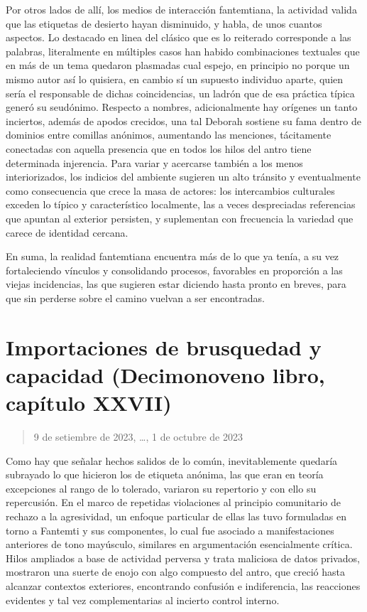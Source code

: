 \documentclass[
]{book}
\begin{document}
Por otros lados de allí, los medios de interacción fantemtiana, la actividad valida que las etiquetas de desierto hayan disminuido, y habla, de unos cuantos aspectos. Lo destacado en linea del clásico que es lo reiterado corresponde a las palabras, literalmente en múltiples casos han habido combinaciones textuales que en más de un tema quedaron plasmadas cual espejo, en principio no porque un mismo autor así lo quisiera, en cambio sí un supuesto individuo aparte, quien sería el responsable de dichas coincidencias, un ladrón que de esa práctica típica generó su seudónimo. Respecto a nombres, adicionalmente hay orígenes un tanto inciertos, además de apodos crecidos, una tal Deborah sostiene su fama dentro de dominios entre comillas anónimos, aumentando las menciones, tácitamente conectadas con aquella presencia que en todos los hilos del antro tiene determinada injerencia. Para variar y acercarse también a los menos interiorizados, los indicios del ambiente sugieren un alto tránsito y eventualmente como consecuencia que crece la masa de actores: los intercambios culturales exceden lo típico y característico localmente, las a veces despreciadas referencias que apuntan al exterior persisten, y suplementan con frecuencia la variedad que carece de identidad cercana.

En suma, la realidad fantemtiana encuentra más de lo que ya tenía, a su vez fortaleciendo vínculos y consolidando procesos, favorables en proporción a las viejas incidencias, las que sugieren estar diciendo hasta pronto en breves, para que sin perderse sobre el camino vuelvan a ser encontradas.

\hypertarget{importaciones-de-brusquedad-y-capacidad-decimonoveno-libro-capuxedtulo-xxvii}{%
\section{Importaciones de brusquedad y capacidad (Decimonoveno libro, capítulo XXVII)}\label{importaciones-de-brusquedad-y-capacidad-decimonoveno-libro-capuxedtulo-xxvii}}

\begin{quote}
9 de setiembre de 2023, \ldots, 1 de octubre de 2023
\end{quote}

Como hay que señalar hechos salidos de lo común, inevitablemente quedaría subrayado lo que hicieron los de etiqueta anónima, las que eran en teoría excepciones al rango de lo tolerado, variaron su repertorio y con ello su repercusión. En el marco de repetidas violaciones al principio comunitario de rechazo a la agresividad, un enfoque particular de ellas las tuvo formuladas en torno a Fantemti y sus componentes, lo cual fue asociado a manifestaciones anteriores de tono mayúsculo, similares en argumentación esencialmente crítica. Hilos ampliados a base de actividad perversa y trata maliciosa de datos privados, mostraron una suerte de enojo con algo compuesto del antro, que creció hasta alcanzar contextos exteriores, encontrando confusión e indiferencia, las reacciones evidentes y tal vez complementarias al incierto control interno.
\end{document}
